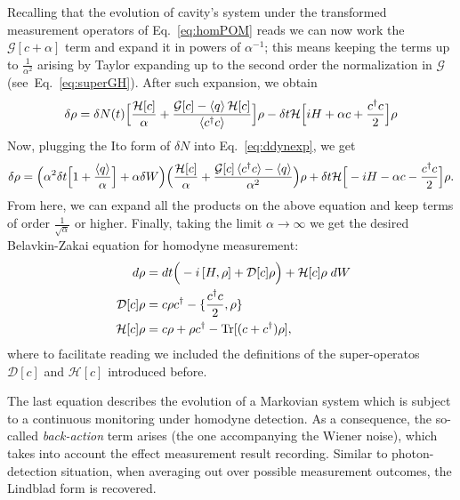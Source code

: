 Recalling that the evolution of cavity's system under the transformed measurement operators of Eq.~\eqref{eq:homPOM} reads
we can now work the $\mathcal{G}[c+\alpha]$ term and expand it in powers of $\alpha^{-1}$; this means keeping the terms up to $\frac{1}{\alpha^2}$ arising by Taylor expanding up to the second order the normalization in $\mathcal{G}$ (see Eq.~\ref{eq:superGH}). After such expansion, we obtain
\begin{equation}\label{eq:ddynexp}
\delta \rho = \delta N(t) \Big[ \frac{\mathcal{H}[c]}{\alpha} + \frac{\mathcal{G}[c] - \mathinner{\langle q\rangle} \mathcal{H}[c]}{\mathinner{\langle c^\dagger c\rangle}} \Big] \rho - \delta t \mathcal{H}\Big[i H + \alpha c + \frac{c^\dagger c}{2}\Big]\rho
\end{equation}
Now, plugging the Ito form of $\delta N$ into Eq.~\ref{eq:ddynexp}, we get
\begin{equation*}
\delta \rho = \Big( \alpha^2 \delta t \Big[ 1 + \frac{\mathinner{\langle q\rangle}}{\alpha}\Big] + \alpha \delta W \Big) \Big( \frac{\mathcal{H}[c]}{\alpha} + \frac{\mathcal{G}[c]\mathinner{\langle c^\dagger c\rangle} - \mathinner{\langle q\rangle}}{\alpha^2} \Big)
\rho + \delta t \mathcal{H}\Big[-i H - \alpha c - \frac{c^\dagger c}{2}\Big]\rho.
\end{equation*}
From here, we can expand all the products on the above equation and keep terms of order $\frac{1}{\sqrt{\alpha}}$ or higher. Finally, taking the limit $\alpha\rightarrow \infty$ we get the desired Belavkin-Zakai equation for homodyne measurement:
\begin{align}\label{eq:1introBELAVKIN}
d\rho &= dt\Big(- \ii \Comm{H}{\rho} + \mathcal{D}[c]\rho\Big) + \mathcal{H}[c]\rho \;dW\\
\mathcal{D}[c]\rho &= c\rho c^\dagger - \llaves{\frac{c^\dagger c}{2},\rho} \\ \nonumber
\mathcal{H}[c]\rho &= c\rho + \rho c^\dagger - \tr{(c+c^\dagger)\rho},\nonumber
\end{align}
where to facilitate reading we included the definitions of the super-operatos $\mathcal{D}[c]$ and $\mathcal{H}[c]$ introduced before.

The last equation describes the evolution of a Markovian system which is subject to a continuous monitoring under homodyne detection. As a consequence, the so-called \textit{back-action} term arises (the one accompanying the Wiener noise), which takes into account the effect measurement result recording. Similar to photon-detection situation, when averaging out over possible measurement outcomes, the Lindblad form is recovered.%

